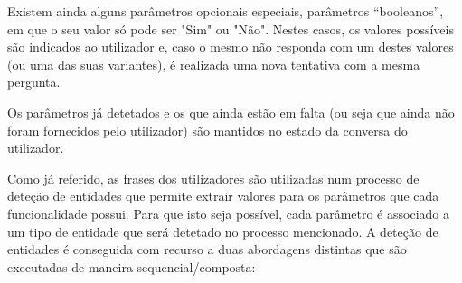\documentclass[11pt,a4paper]{article}
\begin{document}
Existem ainda alguns parâmetros opcionais especiais, parâmetros ``booleanos'', em que o seu valor só pode
ser "Sim" ou "Não". Nestes casos, os valores possíveis são indicados ao utilizador e, caso o mesmo não
responda com um destes valores (ou uma das suas variantes), é realizada uma nova tentativa com a mesma
pergunta.

Os parâmetros já detetados e os que ainda estão em falta (ou seja que ainda não foram
fornecidos pelo utilizador) são mantidos no estado da conversa do utilizador.

Como já referido, as frases dos utilizadores são utilizadas num processo de deteção de entidades que permite
extrair valores para os parâmetros que cada funcionalidade possui. Para que isto seja possível, cada
parâmetro é associado a um tipo de entidade que será detetado no processo mencionado. A deteção de entidades
é conseguida com recurso a duas abordagens distintas que são executadas de maneira sequencial/composta:
\end{document}
